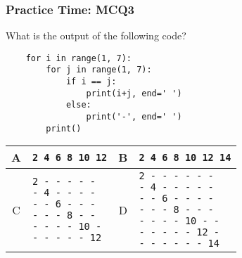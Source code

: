 \documentclass{beamer}
\begin{document}
\begin{frame}[fragile]
    \frametitle{Practice Time: MCQ3}
    What is the output of the following code?

    \begin{verbatim}
    for i in range(1, 7):
        for j in range(1, 7):
            if i == j:
                print(i+j, end=' ')
            else:
                print('-', end=' ')
        print()
    \end{verbatim}

    \begin{tabular}{cl|cl}
        A & \texttt{2 4 6 8 10 12} & B & \texttt{2 4 6 8 10 12 14} \\\hline
        C &
        \makecell[tl]{
        \texttt{2 - - - - - }                                      \\
        \texttt{- 4 - - - - }                                      \\
        \texttt{- - 6 - - - }                                      \\
        \texttt{- - - 8 - - }                                      \\
        \texttt{- - - - 10 - }                                     \\
        \texttt{- - - - - 12}                                      \\
        }
          & D                      &
        \makecell[tl]{
        \texttt{2 - - - - - - }                                    \\
        \texttt{- 4 - - - - - }                                    \\
        \texttt{- - 6 - - - - }                                    \\
        \texttt{- - - 8 - - - }                                    \\
        \texttt{- - - - 10 - - }                                   \\
        \texttt{- - - - - 12 - }                                   \\
        \texttt{- - - - - - 14}                                    \\
        }
    \end{tabular}
\end{frame}
\end{document}
